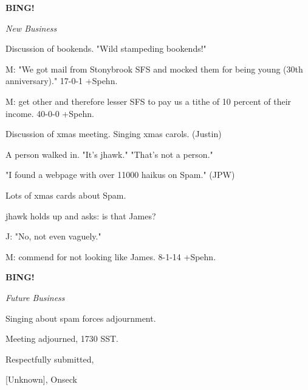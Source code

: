 \documentclass[12pt]{article}
\newcommand{\bing}{{\bf BING!} }
\newcommand{\goto}[1]{\bing \vskip 12pt \centerline{{\em{#1}}}}
\begin{document}
\goto{New Business}

Discussion of bookends. "Wild stampeding bookends!"

M: "We got mail from Stonybrook SFS and mocked them for being young (30th anniversary)." 17-0-1 +Spehn.

M: get other and therefore lesser SFS to pay us a tithe of 10 percent of their income. 40-0-0 +Spehn.

Discussion of xmas meeting. Singing xmas carols. (Justin)

A person walked in. "It's jhawk." "That's not a person."

"I found a webpage with over 11000 haikus on Spam." (JPW)

Lots of xmas cards about Spam.

jhawk holds up and asks: is that James?

J: "No, not even vaguely."

M: commend for not looking like James. 8-1-14 +Spehn.

\goto{Future Business}

Singing about spam forces adjournment.

\vspace{12pt}

\noindent
Meeting adjourned, 1730 SST.

\vspace{18pt}

\centerline{Respectfully submitted,}
\centerline{[Unknown], Onseck}
\end{document}
